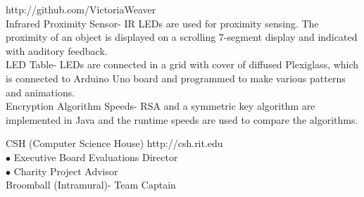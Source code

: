 \documentclass[10pt]{article} %
\begin{document}
\bigskip


	\hfill http://github.com/VictoriaWeaver\\
\smallskip
	Infrared Proximity Sensor- IR LEDs are used for proximity sensing.  The proximity of an object is displayed on a scrolling 7-segment display and indicated with auditory feedback. \\

	\noindent LED Table- LEDs are connected in a grid with cover of diffused Plexiglass, which is connected to Arduino Uno board and programmed to make various patterns and animations.\\

	\noindent Encryption Algorithm Speeds- RSA and a symmetric key algorithm are implemented in Java and the runtime speeds are used to compare the algorithms.
	

\bigskip


	\newline
		CSH (Computer Science House)	\hfill http://csh.rit.edu\\
			\indent $\bullet$ Executive Board Evaluations Director\\
			\indent $\bullet$ Charity Project Advisor\\
		Broomball (Intramural)- Team Captain
	
\end{document}
